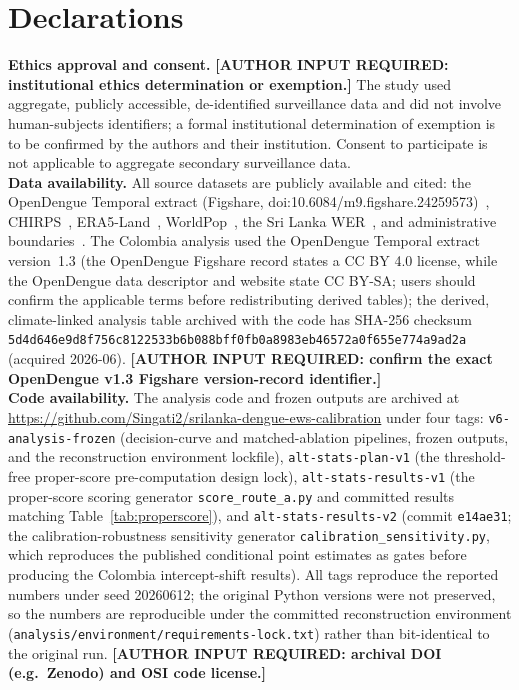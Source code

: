 \documentclass[11pt,a4paper]{article}
\begin{document}
\section*{Declarations}
\textbf{Ethics approval and consent.} \textbf{[AUTHOR INPUT REQUIRED: institutional ethics determination or exemption.]} The study used aggregate, publicly accessible, de-identified surveillance data and did not involve human-subjects identifiers; a formal institutional determination of exemption is to be confirmed by the authors and their institution. Consent to participate is not applicable to aggregate secondary surveillance data.\\
\textbf{Data availability.} All source datasets are publicly available and cited: the OpenDengue Temporal extract (Figshare, doi:10.6084/m9.figshare.24259573)~\cite{Clarke2024OpenDengue,OpenDengue2024}, CHIRPS~\cite{Funk2015,CHIRPS}, ERA5-Land~\cite{MunozSabater2021,ERA5LandCDS}, WorldPop~\cite{Tatem2017,WorldPop2025}, the Sri Lanka WER~\cite{SriLankaWER}, and administrative boundaries~\cite{HDXCODABSriLanka}. The Colombia analysis used the OpenDengue Temporal extract version~1.3 (the OpenDengue Figshare record states a CC BY 4.0 license, while the OpenDengue data descriptor and website state CC BY-SA; users should confirm the applicable terms before redistributing derived tables); the derived, climate-linked analysis table archived with the code has SHA-256 checksum \texttt{5d4d646e9d8f756c8122533b6b088bff0fb0a8983eb46572a0f655e774a9ad2a} (acquired 2026-06). \textbf{[AUTHOR INPUT REQUIRED: confirm the exact OpenDengue v1.3 Figshare version-record identifier.]}\\
\textbf{Code availability.} The analysis code and frozen outputs are archived at \url{https://github.com/Singati2/srilanka-dengue-ews-calibration} under four tags: \texttt{v6-analysis-frozen} (decision-curve and matched-ablation pipelines, frozen outputs, and the reconstruction environment lockfile), \texttt{alt-stats-plan-v1} (the threshold-free proper-score pre-computation design lock), \texttt{alt-stats-results-v1} (the proper-score scoring generator \texttt{score\_route\_a.py} and committed results matching Table~\ref{tab:properscore}), and \texttt{alt-stats-results-v2} (commit \texttt{e14ae31}; the calibration-robustness sensitivity generator \texttt{calibration\_sensitivity.py}, which reproduces the published conditional point estimates as gates before producing the Colombia intercept-shift results). All tags reproduce the reported numbers under seed 20260612; the original Python versions were not preserved, so the numbers are reproducible under the committed reconstruction environment (\texttt{analysis/environment/requirements-lock.txt}) rather than bit-identical to the original run. \textbf{[AUTHOR INPUT REQUIRED: archival DOI (e.g.\ Zenodo) and OSI code license.]}\\
\end{document}

